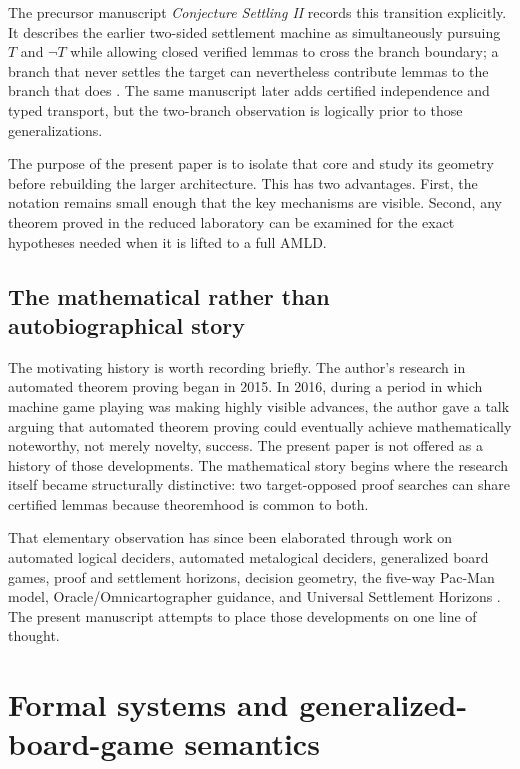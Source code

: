 \documentclass[11pt]{article}
\theoremstyle{remark}
\begin{document}
The precursor manuscript \emph{Conjecture Settling II} records this transition explicitly. It describes the earlier two-sided settlement machine as simultaneously pursuing $T$ and $\neg T$ while allowing closed verified lemmas to cross the branch boundary; a branch that never settles the target can nevertheless contribute lemmas to the branch that does \cite{TennesonCSII}. The same manuscript later adds certified independence and typed transport, but the two-branch observation is logically prior to those generalizations.

The purpose of the present paper is to isolate that core and study its geometry before rebuilding the larger architecture. This has two advantages. First, the notation remains small enough that the key mechanisms are visible. Second, any theorem proved in the reduced laboratory can be examined for the exact hypotheses needed when it is lifted to a full AMLD.

\subsection{The mathematical rather than autobiographical story}

The motivating history is worth recording briefly. The author's research in automated theorem proving began in 2015. In 2016, during a period in which machine game playing was making highly visible advances, the author gave a talk arguing that automated theorem proving could eventually achieve mathematically noteworthy, not merely novelty, success. The present paper is not offered as a history of those developments. The mathematical story begins where the research itself became structurally distinctive: two target-opposed proof searches can share certified lemmas because theoremhood is common to both.

That elementary observation has since been elaborated through work on automated logical deciders, automated metalogical deciders, generalized board games, proof and settlement horizons, decision geometry, the five-way Pac-Man model, Oracle/Omnicartographer guidance, and Universal Settlement Horizons \cite{TennesonDepths48,TennesonGBG,TennesonPacMan,TennesonOracle,TennesonAMLDII,TennesonUSH}. The present manuscript attempts to place those developments on one line of thought.

\section{Formal systems and generalized-board-game semantics}
\end{document}
